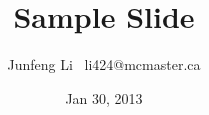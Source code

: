 \documentclass{beamer}
\title{Sample Slide}
\author{Junfeng Li \ li424@mcmaster.ca}
\date{Jan 30, 2013}
\begin{document}
\begin{frame}
    \maketitle
\end{frame}
\end{document}
